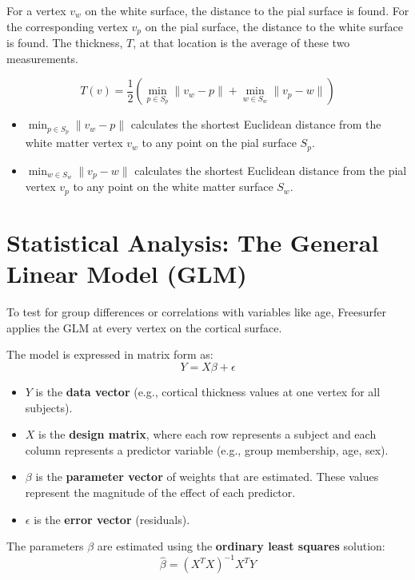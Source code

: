 \documentclass[12pt]{article}
\begin{document}
For a vertex $v_w$ on the white surface, the distance to the pial surface is found. For the corresponding vertex $v_p$ on the pial surface, the distance to the white surface is found. The thickness, $T$, at that location is the average of these two measurements.

\begin{equation}
T(v) = \frac{1}{2} \left( \min_{p \in S_p} \|v_w - p\| + \min_{w \in S_w} \|v_p - w\| \right)
\end{equation}
\begin{itemize}
    \item $\min_{p \in S_p} \|v_w - p\|$ calculates the shortest Euclidean distance from the white matter vertex $v_w$ to any point on the pial surface $S_p$.
    \item $\min_{w \in S_w} \|v_p - w\|$ calculates the shortest Euclidean distance from the pial vertex $v_p$ to any point on the white matter surface $S_w$.
\end{itemize}

\section{Statistical Analysis: The General Linear Model (GLM)}

To test for group differences or correlations with variables like age, Freesurfer applies the GLM at every vertex on the cortical surface.

The model is expressed in matrix form as:
\begin{equation}
Y = X\beta + \epsilon
\end{equation}
\begin{itemize}
    \item $Y$ is the \textbf{data vector} (e.g., cortical thickness values at one vertex for all subjects).
    \item $X$ is the \textbf{design matrix}, where each row represents a subject and each column represents a predictor variable (e.g., group membership, age, sex).
    \item $\beta$ is the \textbf{parameter vector} of weights that are estimated. These values represent the magnitude of the effect of each predictor.
    \item $\epsilon$ is the \textbf{error vector} (residuals).
\end{itemize}

The parameters $\beta$ are estimated using the \textbf{ordinary least squares} solution:
\begin{equation}
\hat{\beta} = (X^T X)^{-1} X^T Y
\end{equation}
\end{document}
